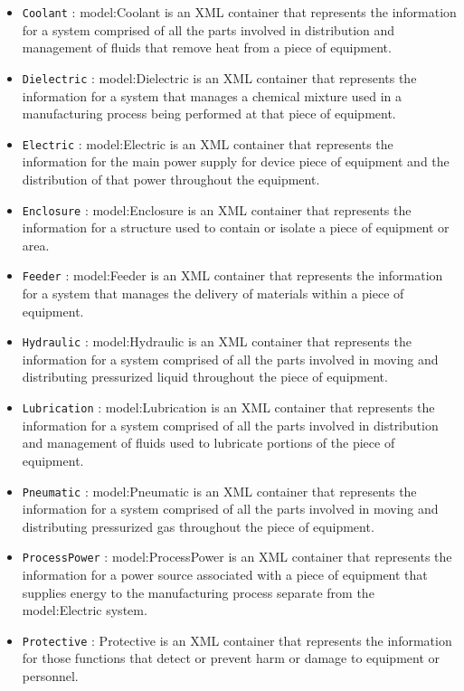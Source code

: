 \begin{itemize}

\item \texttt{Coolant} : {model:Coolant} is an XML container that represents the information for a system comprised of all the parts involved in distribution and management of fluids that remove heat from a piece of equipment.

\item \texttt{Dielectric} : {model:Dielectric} is an XML container that represents the information for a system that manages a chemical mixture used in a manufacturing process being performed at that piece of equipment.

\item \texttt{Electric} : {model:Electric} is an XML container that represents the information for the main power supply for device piece of equipment and the distribution of that power throughout the equipment.

\item \texttt{Enclosure} : {model:Enclosure} is an XML container that represents the information for a structure used to contain or isolate a piece of equipment or area.

\item \texttt{Feeder} : {model:Feeder} is an XML container that represents the information for a system that manages the delivery of materials within a piece of equipment.

\item \texttt{Hydraulic} : {model:Hydraulic} is an XML container that represents the information for a system comprised of all the parts involved in moving and distributing pressurized liquid throughout the piece of equipment.

\item \texttt{Lubrication} : {model:Lubrication} is an XML container that represents the information for a system comprised of all the parts involved in distribution and management of fluids used to lubricate portions of the piece of equipment.

\item \texttt{Pneumatic} : {model:Pneumatic} is an XML container that represents the information for a system comprised of all the parts involved in moving and distributing pressurized gas throughout the piece of equipment.

\item \texttt{ProcessPower} : {model:ProcessPower} is an XML container that represents the information for a power source associated with a piece of equipment that supplies energy to the manufacturing process separate from the {model:Electric} system.

\item \texttt{Protective} : Protective is an XML container that represents the information for those functions that detect or prevent harm or damage to equipment or personnel.

\end{itemize}

\FloatBarrier
